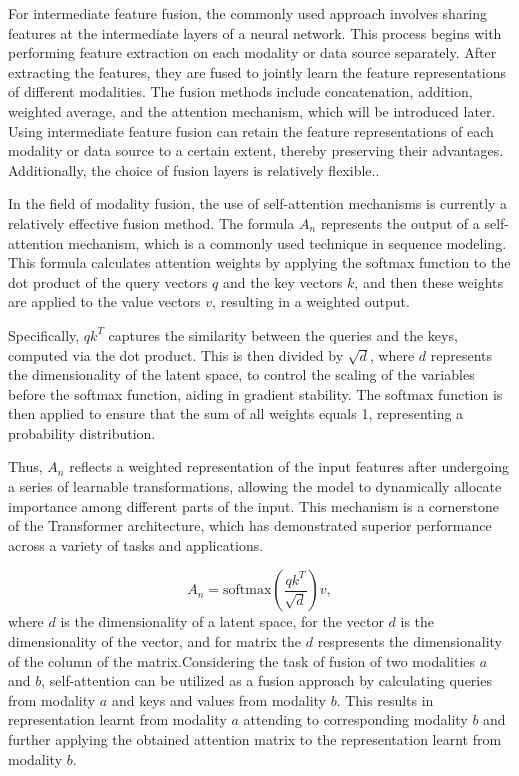 For intermediate feature fusion, the commonly used approach involves sharing features at the intermediate layers of a neural network. This process begins with performing feature extraction on each modality or data source separately. After extracting the features, they are fused to jointly learn the feature representations of different modalities. The fusion methods include concatenation, addition, weighted average, and the attention mechanism, which will be introduced later. Using intermediate feature fusion can retain the feature representations of each modality or data source to a certain extent, thereby preserving their advantages. Additionally, the choice of fusion layers is relatively flexible.\cite{9068523}.

In the field of modality fusion, the use of self-attention mechanisms is currently a relatively effective fusion method\cite{vaswani2017attention}. The formula \( A_n \) represents the output of a self-attention mechanism, which is a commonly used technique in sequence modeling. This formula calculates attention weights by applying the softmax function to the dot product of the query vectors \( q \) and the key vectors \( k \), and then these weights are applied to the value vectors \( v \), resulting in a weighted output.

Specifically, \( qk^T \) captures the similarity between the queries and the keys, computed via the dot product. This is then divided by \( \sqrt{d} \), where \( d \) represents the dimensionality of the latent space, to control the scaling of the variables before the softmax function, aiding in gradient stability. The softmax function is then applied to ensure that the sum of all weights equals 1, representing a probability distribution.

Thus, \( A_n \) reflects a weighted representation of the input features after undergoing a series of learnable transformations, allowing the model to dynamically allocate importance among different parts of the input. This mechanism is a cornerstone of the Transformer architecture, which has demonstrated superior performance across a variety of tasks and applications.

\begin{equation}
A_n = \text{softmax}\left(\frac{qk^T}{\sqrt{d}}\right)v,
\end{equation}
where \( d \) is the dimensionality of a latent space, for the vector \( d \) is the dimensionality of the vector, and for matrix the \( d \) respresents the dimensionality of the column of the matrix.Considering the task of fusion of two modalities \( a \) and \( b \), self-attention can be utilized as a fusion approach by calculating queries from modality \( a \) and keys and values from modality \( b \). This results in representation learnt from modality \( a \) attending to corresponding modality \( b \) and further applying the obtained attention matrix to the representation learnt from modality \( b \).

